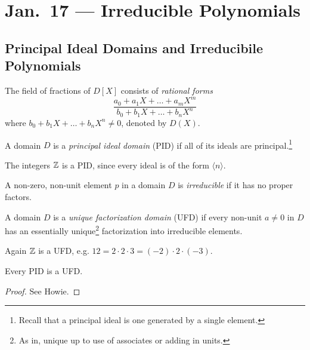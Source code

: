 \chapter{Jan.~17 --- Irreducible Polynomials}

\section{Principal Ideal Domains and Irreducibile Polynomials}
\begin{definition}
  The field of fractions of $D[X]$ consists of
  \emph{rational forms}
  \[
    \frac{a_0 + a_1 X + \dots + a_m X^m}{b_0 + b_1 X + \dots + b_n X^n}
  \]
  where $b_0 + b_1 X + \dots + b_n X^n \ne 0$,
  denoted by $D(X)$.
\end{definition}

\begin{definition}
  A domain $D$ is a \emph{principal ideal domain} (PID)
  if all of its ideals are principal.\footnote{Recall that a principal ideal is one generated by a single element.}
\end{definition}

\begin{example}
  The integers $\mathbb{Z}$ is a PID, since every ideal is of
  the form $\langle n \rangle$.
\end{example}

\begin{definition}
  A non-zero, non-unit element $p$ in a domain $D$
  is \emph{irreducible} if it has no proper factors.
\end{definition}

\begin{definition}
  A domain $D$ is a \emph{unique factorization domain} (UFD)
  if every non-unit $a \ne 0$ in $D$ has an
  essentially unique\footnote{As in, unique up to use of associates or adding in units.} factorization into irreducible
  elements.
\end{definition}

\begin{example}
  Again $\mathbb{Z}$ is a UFD, e.g. $12 = 2 \cdot 2 \cdot 3 = (-2) \cdot 2 \cdot (-3)$.
\end{example}

\begin{theorem}
  Every PID is a UFD.
\end{theorem}

\begin{proof}
  See Howie.
\end{proof}

